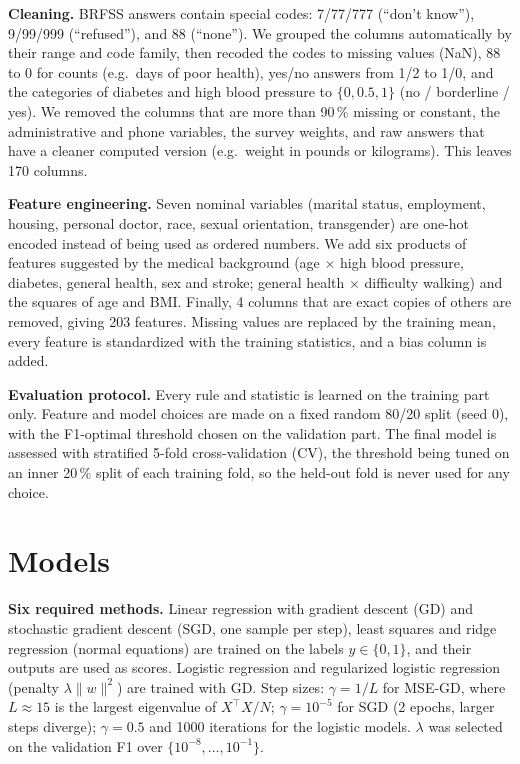 \documentclass[10pt,conference,compsocconf,onecolumn]{IEEEtran}
\begin{document}
\textbf{Cleaning.} BRFSS answers contain special codes: 7/77/777 (``don't
know''), 9/99/999 (``refused''), and 88 (``none''). We grouped the columns
automatically by their range and code family, then recoded the codes to
missing values (NaN), 88 to 0 for counts (e.g.\ days of poor health),
yes/no answers from 1/2 to 1/0, and the categories of diabetes and high
blood pressure to $\{0, 0.5, 1\}$ (no / borderline / yes). We removed the
columns that are more than 90\,\% missing or constant, the administrative
and phone variables, the survey weights, and raw answers that have a
cleaner computed version (e.g.\ weight in pounds or kilograms). This
leaves 170 columns.

\textbf{Feature engineering.} Seven nominal variables (marital status,
employment, housing, personal doctor, race, sexual orientation,
transgender) are one-hot encoded instead of being used as ordered numbers.
We add six products of features suggested by the medical background
(age $\times$ high blood pressure, diabetes, general health, sex and stroke;
general health $\times$ difficulty walking) and the squares of age and BMI.
Finally, 4 columns that are exact copies of others are removed, giving 203
features. Missing values are replaced by the training mean, every feature
is standardized with the training statistics, and a bias column is added.

\textbf{Evaluation protocol.} Every rule and statistic is learned on the
training part only. Feature and model choices are made on a fixed random
80/20 split (seed 0), with the F1-optimal threshold chosen on the
validation part. The final model is assessed with stratified 5-fold
cross-validation (CV), the threshold being tuned on an inner 20\,\% split
of each training fold, so the held-out fold is never used for any choice.

\section{Models}
\label{sec:models}

\textbf{Six required methods.} Linear regression with gradient descent (GD)
and stochastic gradient descent (SGD, one sample per step), least squares
and ridge regression (normal equations) are trained on the labels
$y \in \{0, 1\}$, and their outputs are used as scores. Logistic regression
and regularized logistic regression (penalty $\lambda\|w\|^2$) are trained
with GD. Step sizes: $\gamma = 1/L$ for MSE-GD, where $L \approx 15$ is the
largest eigenvalue of $X^\top X/N$; $\gamma = 10^{-5}$ for SGD (2 epochs,
larger steps diverge); $\gamma = 0.5$ and 1000 iterations for the logistic
models. $\lambda$ was selected on the validation F1 over
$\{10^{-8}, \ldots, 10^{-1}\}$.
\end{document}
